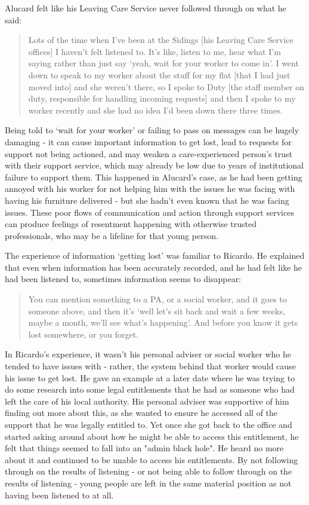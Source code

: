 Alucard felt like his Leaving Care Service never followed through on what he said:
\begin{quote}
Lots of the time when I've been at the Sidings [his Leaving Care Service offices] I haven't felt listened to. It's like, listen to me, hear what I'm saying rather than just say `yeah, wait for your worker to come in'. I went down to speak to my worker about the stuff for my flat [that I had just moved into] and she weren't there, so I spoke to Duty [the staff member on duty, responsible for handling incoming requests] and then I spoke to my worker recently and she had no idea I'd been down there three times.
\end{quote}
Being told to `wait for your worker' or failing to pass on messages can be hugely damaging - it can cause important information to get lost, lead to requests for support not being actioned, and may weaken a care-experienced person’s trust with their support service, which may already be low due to years of institutional failure to support them.  This happened in Alucard’s case, as he had been getting annoyed with his worker for not helping him with the issues he was facing with having his furniture delivered - but she hadn’t even known that he was facing issues. These poor flows of communication and action through support services can produce feelings of resentment happening with otherwise trusted professionals, who may be a lifeline for that young person. 

The experience of information `getting lost' was familiar to Ricardo. He explained that even when information has been accurately recorded, and he had felt like he had been listened to, sometimes information seems to disappear:
\begin{quote}
You can mention something to a PA, or a social worker, and it goes to someone above, and then it's `well let's sit back and wait a few weeks, maybe a month, we'll see what's happening'. And before you know it gets lost somewhere, or you forget.
\end{quote}
In Ricardo's experience, it wasn’t his personal adviser or social worker who he tended to have issues with - rather, the system behind that worker would cause his issue to get lost. He gave an example at a later date where he was trying to do some research into some legal entitlements that he had as someone who had left the care of his local authority. His personal adviser was supportive of him finding out more about this, as she wanted to ensure he accessed all of the support that he was legally entitled to. Yet once she got back to the office and started asking around about how he might be able to access this entitlement, he felt that things seemed to fall into an "admin black hole". He heard no more about it and continued to be unable to access his entitlements. By not following through on the results of listening - or not being able to follow through on the results of listening - young people are left in the same material position as not having been listened to at all. 


